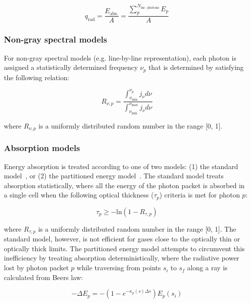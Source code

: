 \begin{equation}
 q_\text{rad} = \frac{ E_\text{abs.} }{A} =  \frac{ \displaystyle \sum_{p}^{N_{\text{inc. photons}}} \displaystyle E_{p} }{ A }
 \label{eq:my_divq_MC_2}
\end{equation}

\subsubsection{Non-gray spectral models}

For non-gray spectral models (e.g. line-by-line representation), each photon is assigned a statistically determined frequency $\nu_p$ that is determined by satisfying the following relation:

\begin{equation}
R_{\nu,p} = \frac{\int_{\nu_{\text{min}}}^{\nu_p} j_{\nu} d \nu}{\int_{\nu_{\text{min}}}^{\nu_{\text{max}}} j_{\nu} d \nu}
\end{equation}

\noindent where $R_{\nu,p}$ is a uniformly distributed random number in the range [0, 1].

\subsubsection{Absorption models}

Energy absorption is treated according to one of two models:  (1) the standard model~\cite{Mod03}, or (2) the partitioned energy model~\cite{MP77}.
The standard model treats absorption statistically, where all the energy of the photon packet is absorbed in a single cell when the following optical thickness ($\tau_p$) criteria is met for photon $p$:

\begin{equation}
 \tau_p \geq - \text{ln} \left ( 1 - R_{\tau,p} \right ) 
\end{equation}

\noindent where $R_{\tau,p}$ is a uniformly distributed random number in the range [0, 1].
The standard model, however, is not efficient for gases close to the optically thin or optically thick limits.
The partitioned energy model attempts to circumvent this inefficiency by treating absorption deterministically, where the radiative power lost by photon packet $p$ while traversing from points $s_{i}$ to $s_{f}$ along a ray is calculated from Beers law:

\begin{equation}
 - \Delta E_{p} = - ( 1 - e^{-\kappa_p(s) \Delta s } ) E_{p}(s_{i})
 \label{eq:E_p}
\end{equation}

